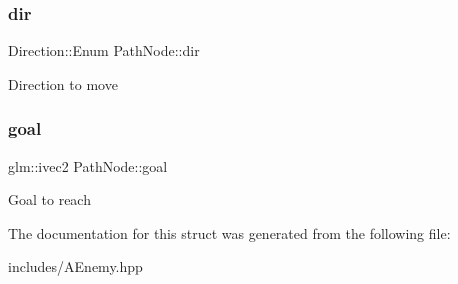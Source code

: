 \subsubsection{\texorpdfstring{dir}{dir}}
{\footnotesize\ttfamily Direction\+::\+Enum Path\+Node\+::dir}

Direction to move \mbox{\label{struct_path_node_aac57cd4c91aee6058d05f9e4944bb43c}} 
\subsubsection{\texorpdfstring{goal}{goal}}
{\footnotesize\ttfamily glm\+::ivec2 Path\+Node\+::goal}

Goal to reach 

The documentation for this struct was generated from the following file\+:\begin{DoxyCompactItemize}
\item 
includes/A\+Enemy.\+hpp\end{DoxyCompactItemize}
